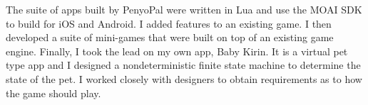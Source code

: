 The suite of apps built by PenyoPal were written in Lua and use the MOAI SDK to
build for iOS and Android. I added features to an existing game. I then
developed a suite of mini-games that were built on top of an existing game
engine. Finally, I took the lead on my own app, Baby Kirin. It is a virtual pet
type app and I designed a nondeterministic finite state machine to determine the
state of the pet. I worked closely with designers to obtain requirements as to
how the game should play.
